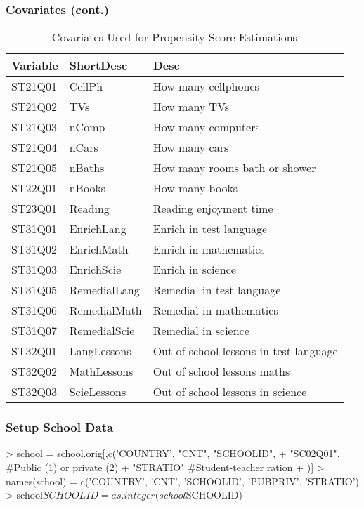 \documentclass[10pt,slidestop,mathserif]{beamer}
\begin{document}
\begin{frame}
	\frametitle{Covariates (cont.)}
\begin{table}[ht]
\begin{center}
\begin{tabular}{lll}
  \hline
Variable & ShortDesc & Desc \\ 
  \hline
ST21Q01 & CellPh & How many cellphones \\ 
  ST21Q02 & TVs & How many TVs \\ 
  ST21Q03 & nComp & How many computers \\ 
  ST21Q04 & nCars & How many cars \\ 
  ST21Q05 & nBaths & How many rooms bath or shower \\ 
  ST22Q01 & nBooks & How many books \\ 
  ST23Q01 & Reading & Reading enjoyment time \\ 
  ST31Q01 & EnrichLang & Enrich in test language \\ 
  ST31Q02 & EnrichMath & Enrich in mathematics \\ 
  ST31Q03 & EnrichScie & Enrich in science \\ 
  ST31Q05 & RemedialLang & Remedial in test language \\ 
  ST31Q06 & RemedialMath & Remedial in mathematics \\ 
  ST31Q07 & RemedialScie & Remedial in science \\ 
  ST32Q01 & LangLessons & Out of school lessons in test language \\ 
  ST32Q02 & MathLessons & Out of school lessons maths \\ 
  ST32Q03 & ScieLessons & Out of school lessons in science \\ 
   \hline
\end{tabular}
\caption{Covariates Used for Propensity Score Estimations}
\end{center}
\end{table}
\end{frame}

\begin{frame}
	\frametitle{Setup School Data}
\begin{Schunk}
\begin{Sinput}
> school = school.orig[,c('COUNTRY', "CNT", "SCHOOLID",
+ 	"SC02Q01", #Public (1) or private (2)
+ 	"STRATIO" #Student-teacher ration    
+ )]
> names(school) = c('COUNTRY', 'CNT', 'SCHOOLID', 'PUBPRIV', 'STRATIO')
> school$SCHOOLID = as.integer(school$SCHOOLID)
\end{Sinput}
\end{Schunk}
\end{frame}
\end{document}
